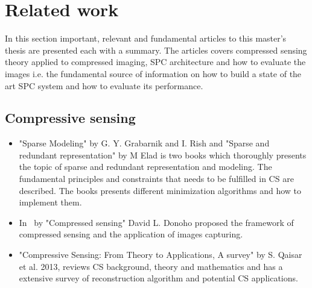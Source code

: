 \chapter{Related work} \label{sec:related_work}
In this section important, relevant and fundamental articles to this master's thesis are presented each with a summary. The articles covers compressed sensing theory applied to compressed imaging, SPC architecture and how to evaluate the images i.e. the fundamental source of information on how to build a state of the art SPC system and how to evaluate its performance. 

\section{Compressive sensing}
\begin{itemize}


\item \cite{book:sm, book:srr} "Sparse Modeling" by G. Y. Grabarnik and  I. Rish and "Sparse and redundant representation" by M Elad is two books which thoroughly presents the topic of sparse and redundant representation and modeling. The fundamental principles and constraints that needs to be fulfilled in CS are described. The books presents different minimization algorithms and how to implement them.   

\item In~\cite{article:CS_donoho1} by "Compressed sensing" David L. Donoho proposed the framework of compressed sensing and the application of images capturing.

\item \cite{article:CS_from_theory_a_sur} "Compressive Sensing: From Theory to Applications, A survey" by S. Qaisar et al. 2013, reviews CS background, theory and mathematics and has a extensive survey of reconstruction algorithm and potential CS applications.

\end{itemize}
